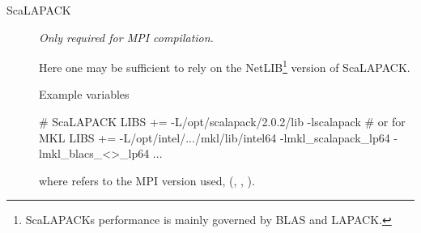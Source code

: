 \begin{description}
  \item[ScaLAPACK]%
  \emph{Only required for MPI compilation.}

  Here one may be sufficient to rely on the NetLIB\footnote{ScaLAPACKs
      performance is mainly governed by BLAS and LAPACK.} version of
  ScaLAPACK. 

  Example variables
\begin{shellexample}
  # ScaLAPACK
  LIBS += -L/opt/scalapack/2.0.2/lib -lscalapack
  # or for MKL
  LIBS += -L/opt/intel/.../mkl/lib/intel64 -lmkl_scalapack_lp64 
           -lmkl_blacs_<>_lp64 ...
\end{shellexample}
where \shell{<>} refers to the MPI version used, (,
, ).


\end{description}

